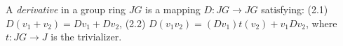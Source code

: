 A \textit{derivative} in a group ring $JG$ is a mapping $D: JG \to JG$ satisfying:
(2.1) $D(v_1 + v_2) = Dv_1 + Dv_2$,
(2.2) $D(v_1 v_2) = (Dv_1) t(v_2) + v_1 Dv_2$,
where $t: JG \to J$ is the trivializer.
